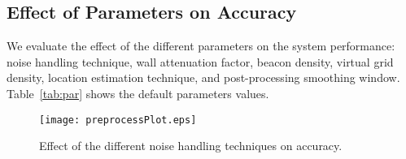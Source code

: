 \documentclass[conference]{IEEEtran}
\begin{document}
\begin{table}[!t]
\centering
{}
\caption{Testbed parameters.}
\label{tab:comp}
\end{table}

\begin{table}[!t]
\centering
{}
\caption{Default parameters values used in evaluation.}
\label{tab:par}
\end{table}

\subsection{Effect of Parameters on Accuracy}
We evaluate the effect of the different parameters on the system performance: noise handling technique, wall attenuation factor, beacon density, virtual grid density, 
 location estimation technique, and post-processing smoothing window. 
Table~\ref{tab:par} shows the default parameters values.

\begin{figure}[!t]
\centering
\texttt{[image: preprocessPlot.eps]}
\caption{Effect of the different noise handling techniques on accuracy.}
\label{fig:preprocess}
\end{figure}
\end{document}
